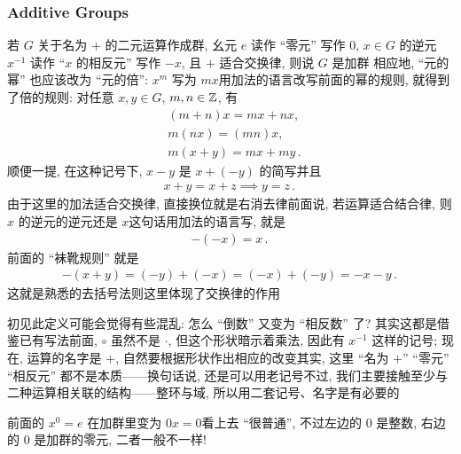 \subsubsection*{Additive Groups}

\begin{definition}
    若 $G$ 关于名为 $+$ 的二元运算作成群, 幺元 $e$ 读作 ``零元'' 写作 $0$, $x \in G$ 的逆元 $x^{-1}$ 读作 ``$x$ 的相反元'' 写作 $-x$, 且 $+$ 适合交换律, 则说 $G$ 是加群 \period 相应地, ``元的幂'' 也应该改为 ``元的倍'': $x^m$ 写为 $mx$\period 用加法的语言改写前面的幂的规则, 就得到了倍的规则: 对任意 $x,y \in G$, $m,n \in \mathbb{Z}$, 有
    \begin{align*}
         & (m+n)x = mx + nx,       \\
         & m(nx) = (mn)x,          \\
         & m(x+y) = mx + my\period
    \end{align*}
    顺便一提, 在这种记号下, $x-y$ 是 $x+(-y)$ 的简写\period 并且
    \begin{align*}
        x + y = x + z \implies y = z\period
    \end{align*}
    由于这里的加法适合交换律, 直接换位就是右消去律\period 前面说, 若运算适合结合律, 则 $x$ 的逆元的逆元还是 $x$\period 这句话用加法的语言写, 就是
    \begin{align*}
        -(-x) = x\period
    \end{align*}
    前面的 ``袜靴规则'' 就是
    \begin{align*}
        -(x+y) = (-y) + (-x) = (-x) + (-y) = -x-y\period
    \end{align*}
    这就是熟悉的去括号法则\period 这里体现了交换律的作用\period
\end{definition}

\begin{remark}
    初见此定义可能会觉得有些混乱: 怎么 ``倒数'' 又变为 ``相反数'' 了? 其实这都是借鉴已有写法\period 前面, $\circ$ 虽然不是 $\cdot$, 但这个形状暗示着乘法, 因此有 $x^{-1}$ 这样的记号; 现在, 运算的名字是 $+$, 自然要根据形状作出相应的改变\period 其实, 这里 ``名为 $+$'' ``零元'' ``相反元'' 都不是本质——换句话说, 还是可以用老记号\period 不过, 我们主要接触至少与二种运算相关联的结构——整环与域, 所以用二套记号、名字是有必要的\period
\end{remark}

\begin{remark}
    前面的 $x^0 = e$ 在加群里变为 $0x = 0$\period 看上去 ``很普通'', 不过左边的 $0$ 是整数, 右边的 $0$ 是加群的零元, 二者一般不一样!
\end{remark}

